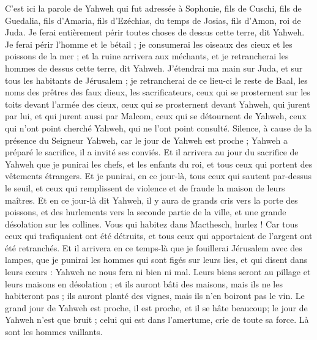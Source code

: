 \begin{multicols}{2}
\VerseOne{}C'est ici la parole de Yahweh qui fut adressée à Sophonie, fils de Cuschi, fils de Guedalia, fils d'Amaria, fils d'Ezéchias, du temps de Josias, fils d'Amon, roi de Juda.
Je ferai entièrement périr toutes choses de dessus cette terre, dit Yahweh.
Je ferai périr l'homme et le bétail ; je consumerai les oiseaux des cieux et les poissons de la mer ; et la ruine arrivera aux méchants, et je retrancherai les hommes de dessus cette terre, dit Yahweh.
J'étendrai ma main sur Juda, et sur tous les habitants de Jérusalem ; je retrancherai de ce lieu-ci le reste de Baal, les noms des prêtres des faux dieux, les sacrificateurs,
ceux qui se prosternent sur les toits devant l'armée des cieux, ceux qui se prosternent devant Yahweh, qui jurent par lui, et qui jurent aussi par Malcom,
ceux qui se détournent de Yahweh, ceux qui n'ont point cherché Yahweh, qui ne l'ont point consulté.
Silence, à cause de la présence du Seigneur Yahweh, car le jour de Yahweh est proche ; Yahweh a préparé le sacrifice, il a invité ses conviés.
Et il arrivera au jour du sacrifice de Yahweh que je punirai les chefs, et les enfants du roi, et tous ceux qui portent des vêtements étrangers.
Et je punirai, en ce jour-là, tous ceux qui sautent par-dessus le seuil, et ceux qui remplissent de violence et de fraude la maison de leurs maîtres.
Et en ce jour-là dit Yahweh, il y aura de grands cris vers la porte des poissons, et des hurlements vers la seconde partie de la ville, et une grande désolation sur les collines.
Vous qui habitez dans Macthesch, hurlez ! Car tous ceux qui trafiquaient ont été détruits, et tous ceux qui apportaient de l'argent ont été retranchés.
Et il arrivera en ce temps-là que je fouillerai Jérusalem avec des lampes, que je punirai les hommes qui sont figés sur leurs lies, et qui disent dans leurs cœurs : Yahweh ne nous fera ni bien ni mal.
Leurs biens seront au pillage et leurs maisons en désolation ; et ils auront bâti des maisons, mais ils ne les habiteront pas ; ils auront planté des vignes, mais ils n'en boiront pas le vin.
Le grand jour de Yahweh est proche, il est proche, et il se hâte beaucoup; le jour de Yahweh n'est que bruit ; celui qui est dans l’amertume, crie de toute sa force. Là sont les hommes vaillants.

\end{multicols}
